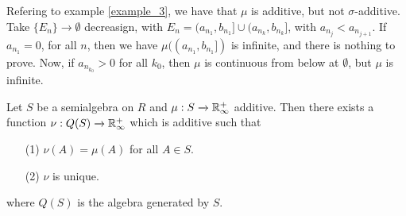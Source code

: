 \begin{example}\label{example_4}
    Refering to example \ref{example_3}, we have that $\mu$ is additive, but not
     $\sigma$-additive. Take $\{E_n\} \xrightarrow{} \emptyset$ decreasign, with
     $E_n=(a_{n_1},b_{n_1}] \cup (a_{n_k},b_{n_k}]$, with $a_{n_j}<a_{n_{j+1}}$.
     If $a_{n_1}=0$, for all $n$, then we have $\mu((a_{n_1},b_{n_1}])$ is
     infinite, and there is nothing to prove. Now, if $a_{n_{k_0}}>0$ for all
     $k_0$, then $\mu$ is continuous from below at  $\emptyset$, but  $\mu$ is
     infinite.
\end{example}

\begin{theorem}\label{theorem_8}
    Let $S$ be a semialgebra on  $R$ and $\mu:S \xrightarrow{} \mathbb{R}^+_\infty$
    additive. Then there exists a function $\nu:Q(S) \xrightarrow{} \mathbb{R}^+_\infty$
    which is additive such that
    \begin{enumerate}
        \item[(1)] $\nu(A)=\mu(A)$ for all $A \in S$.

        \item[(2)] $\nu$ is unique.
    \end{enumerate}
    where $Q(S)$ is the algebra generated by $S$.
\end{theorem}
